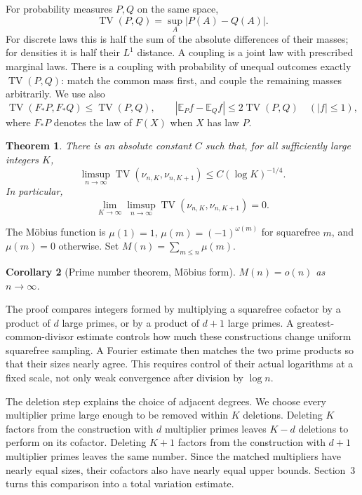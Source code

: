 \documentclass[11pt]{article}
\newtheorem{theorem}{Theorem}[section]
\newtheorem{corollary}[theorem]{Corollary}
\theoremstyle{remark}\newtheorem{remark}[theorem]{Remark}
\DeclareMathOperator{\TV}{TV}
\newcommand{\E}{\mathbb E}
\begin{document}
For probability measures $P,Q$ on the same space,
\[
 \TV(P,Q)=\sup_A|P(A)-Q(A)|.
\]
For discrete laws this is half the sum of the absolute differences of their masses; for densities it is half their $L^1$ distance. A coupling is a joint law with prescribed marginal laws. There is a coupling with probability of unequal outcomes exactly $\TV(P,Q)$: match the common mass first, and couple the remaining masses arbitrarily. We use also
\begin{equation}\label{eq:tvfacts}
 \TV(F_*P,F_*Q)\le\TV(P,Q),\qquad
 |\E_P f-\E_Q f|\le2\TV(P,Q)\quad(|f|\le1),
\end{equation}
where $F_*P$ denotes the law of $F(X)$ when $X$ has law $P$.

\begin{theorem}\label{thm:main}
There is an absolute constant $C$ such that, for all sufficiently large integers $K$,
\begin{equation}\label{eq:main}
 \limsup_{n\to\infty}\TV(\nu_{n,K},\nu_{n,K+1})
 \le C(\log K)^{-1/4}.
\end{equation}
In particular,
\[
 \lim_{K\to\infty}\limsup_{n\to\infty}
 \TV(\nu_{n,K},\nu_{n,K+1})=0.
\]
\end{theorem}

The M\"obius function is $\mu(1)=1$, $\mu(m)=(-1)^{\omega(m)}$ for squarefree $m$, and $\mu(m)=0$ otherwise. Set $M(n)=\sum_{m\le n}\mu(m)$.

\begin{corollary}[Prime number theorem, M\"obius form]\label{cor:mobius}
$M(n)=o(n)$ as $n\to\infty$.
\end{corollary}

The proof compares integers formed by multiplying a squarefree cofactor by a product of $d$ large primes, or by a product of $d+1$ large primes. A greatest-common-divisor estimate controls how much these constructions change uniform squarefree sampling. A Fourier estimate then matches the two prime products so that their sizes nearly agree. This requires control of their actual logarithms at a fixed scale, not only weak convergence after division by $\log n$.

The deletion step explains the choice of adjacent degrees. We choose every multiplier prime large enough to be removed within $K$ deletions. Deleting $K$ factors from the construction with $d$ multiplier primes leaves $K-d$ deletions to perform on its cofactor. Deleting $K+1$ factors from the construction with $d+1$ multiplier primes leaves the same number. Since the matched multipliers have nearly equal sizes, their cofactors also have nearly equal upper bounds. Section~3 turns this comparison into a total variation estimate.
\end{document}
